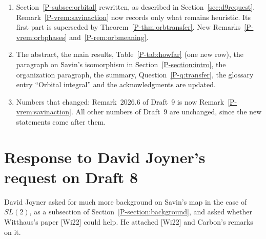 \documentclass[12pt,letterpaper]{amsart}
\begin{document}
\begin{enumerate}[leftmargin=1.5em]
\item Section~\ref{P-subsec:orbital} rewritten, as described in
Section~\ref{sec:d9request}. Remark~\ref{P-vrem:savinaction} now records
only what remains heuristic. Its first part is superseded by
Theorem~\ref{P-thm:orbtransfer}. New Remarks~\ref{P-vrem:orbphases}
and~\ref{P-rem:orbmeaning}.
\item The abstract, the main results, Table~\ref{P-tab:howfar} (one new
row), the paragraph on Savin's isomorphism in
Section~\ref{P-section:intro}, the organization paragraph, the summary,
Question~\ref{P-q:transfer}, the glossary entry ``Orbital integral'' and
the acknowledgments are updated.
\item Numbers that changed: Remark~2026.6 of Draft~9 is now
Remark~\ref{P-vrem:savinaction}. All other numbers of Draft~9 are
unchanged, since the new statements come after them.
\end{enumerate}

\section{Response to David Joyner's request on Draft 8}
\label{sec:d8request}

David Joyner asked for much more background on Savin's map in the case
of $SL(2)$, as a subsection of Section~\ref{P-section:background}, and
asked whether Witthaus's paper [Wi22] could help. He attached [Wi22]
and Carbon's remarks on it.
\end{document}
